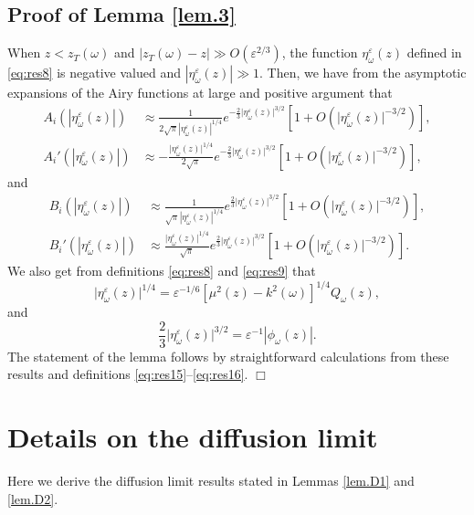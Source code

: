\documentclass[final]{siamltex}
\begin{document}
\subsection{Proof of Lemma \ref{lem.3}}
\label{ap:propagator.3} When $z< z_T({\omega})$ and 
$|z_T({\omega})-z| \gg O({\varepsilon}^{2/3})$, the function $\eta_{\omega}^{\varepsilon}(z)$
defined in \eqref{eq:res8} is negative valued and 
$
|\eta_{\omega}^{\varepsilon}(z)|  \gg 1.
$
Then, we have from the asymptotic expansions of the Airy functions at
large and positive argument that \cite[chapter
  10]{abramowitz1972handbook}
\begin{align}
A_i(|\eta_{\omega}^{\varepsilon}(z)|) &\approx \frac{1}{2\sqrt{\pi}
  |\eta_{\omega}^{\varepsilon}(z)|^{1/4}} e^{-\frac{2}{3}
  \big|\eta_{\omega}^{\varepsilon}(z)\big|^{3/2}} \left[1 +
  O\left(\big|\eta_{\omega}^{\varepsilon}(z)\big|^{-3/2}\right)\right] ,
\\ A_i'(|\eta_{\omega}^{\varepsilon}(z)|) &\approx
-\frac{\big|\eta_{\omega}^{\varepsilon}(z)\big|^{1/4}}{2 \sqrt{\pi}}e^{-\frac{2}{3}
  \big|\eta_{\omega}^{\varepsilon}(z)\big|^{3/2}} \left[1 +
  O\left(\big|\eta_{\omega}^{\varepsilon}(z)\big|^{-3/2}\right)\right] ,
\end{align}
and 
\begin{align}
B_i(|\eta_{\omega}^{\varepsilon}(z)|) &\approx \frac{1}{\sqrt{\pi}
  |\eta_{\omega}^{\varepsilon}(z)|^{1/4}} e^{\frac{2}{3}
  \big|\eta_{\omega}^{\varepsilon}(z)\big|^{3/2}} \left[1 +
  O\left(\big|\eta_{\omega}^{\varepsilon}(z)\big|^{-3/2}\right)\right] ,
\\ B_i'(|\eta_{\omega}^{\varepsilon}(z)|) &\approx
\frac{\big|\eta_{\omega}^{\varepsilon}(z)\big|^{1/4}}{\sqrt{\pi}}e^{\frac{2}{3}
  \big|\eta_{\omega}^{\varepsilon}(z)\big|^{3/2}} \left[1 +
  O\left(\big|\eta_{\omega}^{\varepsilon}(z)\big|^{-3/2}\right)\right].
\end{align}
We also get from definitions \eqref{eq:res8} and \eqref{eq:res9} that 
\begin{equation}
\big|\eta_{\omega}^{\varepsilon}(z)\big|^{1/4} = {\varepsilon}^{-1/6} [\mu^2(z)-k^2({\omega})]^{1/4} Q_{\omega}(z),
\end{equation}
and 
\begin{equation}
\frac{2}{3} \big|\eta_{\omega}^{\varepsilon}(z)\big|^{3/2} = {\varepsilon}^{-1} |\phi_{\omega}(z)|.
\end{equation}
The statement of the lemma follows by straightforward calculations
from these results and definitions \eqref{eq:res15}--\eqref{eq:res16}.
$\Box$
\section{Details on the diffusion limit} 
\label{ap:diflimit}
Here we derive the diffusion limit results stated in Lemmas \ref{lem.D1} and \ref{lem.D2}. 
\end{document}
